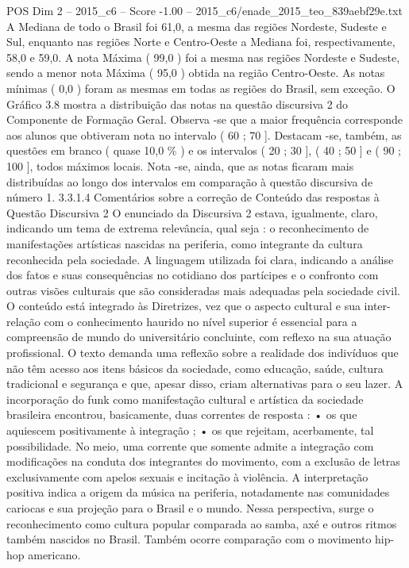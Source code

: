 \begin{textsample}{POS Dim 2 – 2015\_c6 – Score -1.00 – 2015\_c6/enade\_2015\_teo\_839aebf29e.txt}
A Mediana de todo o Brasil foi 61,0, a mesma das regiões Nordeste, Sudeste e Sul, enquanto nas regiões Norte e Centro-Oeste a Mediana foi, respectivamente, 58,0 e 59,0.
A nota Máxima ( 99,0 ) foi a mesma nas regiões Nordeste e Sudeste, sendo a menor nota Máxima ( 95,0 ) obtida na região Centro-Oeste.
As notas mínimas ( 0,0 ) foram as mesmas em todas as regiões do Brasil, sem exceção.
O Gráfico 3.8 mostra a distribuição das notas na questão discursiva 2 do Componente de Formação Geral.
Observa -se que a maior frequência corresponde aos alunos que obtiveram nota no intervalo ( 60 ; 70 ].
Destacam -se, também, as questões em branco ( quase 10,0 \% ) e os intervalos ( 20 ; 30 ], ( 40 ; 50 ] e ( 90 ; 100 ], todos máximos locais.
Nota -se, ainda, que as notas ficaram mais distribuídas ao longo dos intervalos em comparação à questão discursiva de número 1. 3.3.1.4 Comentários sobre a correção de Conteúdo das respostas à Questão Discursiva 2 O enunciado da Discursiva 2 estava, igualmente, claro, indicando um tema de extrema relevância, qual seja : o reconhecimento de manifestações artísticas nascidas na periferia, como integrante da cultura reconhecida pela sociedade.
A linguagem utilizada foi clara, indicando a análise dos fatos e suas consequências no cotidiano dos partícipes e o confronto com outras visões culturais que são consideradas mais adequadas pela sociedade civil.
O conteúdo está integrado às Diretrizes, vez que o aspecto cultural e sua inter-relação com o conhecimento haurido no nível superior é essencial para a compreensão de mundo do universitário concluinte, com reflexo na sua atuação profissional.
O texto demanda uma reflexão sobre a realidade dos indivíduos que não têm acesso aos itens básicos da sociedade, como educação, saúde, cultura tradicional e segurança e que, apesar disso, criam alternativas para o seu lazer.
A incorporação do funk como manifestação cultural e artística da sociedade brasileira encontrou, basicamente, duas correntes de resposta : • os que aquiescem positivamente à integração ; • os que rejeitam, acerbamente, tal possibilidade.
No meio, uma corrente que somente admite a integração com modificações na conduta dos integrantes do movimento, com a exclusão de letras exclusivamente com apelos sexuais e incitação à violência.
A interpretação positiva indica a origem da música na periferia, notadamente nas comunidades cariocas e sua projeção para o Brasil e o mundo.
Nessa perspectiva, surge o reconhecimento como cultura popular comparada ao samba, axé e outros ritmos também nascidos no Brasil.
Também ocorre comparação com o movimento hip-hop americano.

\end{textsample}
